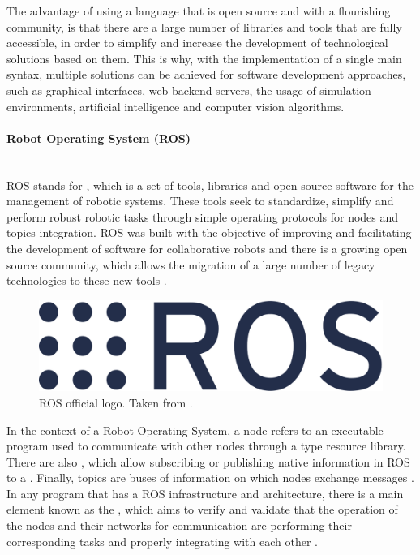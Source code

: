 \documentclass[11pt]{report} %
\newcommand{\subsubsubsection}[1]{\paragraph{#1}\mbox{}\\}
\begin{document}
The advantage of using a language that is open source and with a flourishing community, is that there are a large number of libraries and tools that are fully accessible, in order to simplify and increase the development of technological solutions based on them. This is why, with the implementation of a single main syntax, multiple solutions can be achieved for software development approaches, such as graphical interfaces, web backend servers, the usage of simulation environments, artificial intelligence and computer vision algorithms.\\

\subsubsubsection{Robot Operating System (ROS)}

ROS stands for , which is a set of tools, libraries and open source software for the management of robotic systems. These tools seek to standardize, simplify and perform robust robotic tasks through simple operating protocols for nodes and topics integration. ROS was built with the objective of improving and facilitating the development of software for collaborative robots and there is a growing open source community, which allows the migration of a large number of legacy technologies to these new tools \citep{cite_ROS_official_site}.\\

\begin{figure}[H]
    \centering
    \includegraphics[width=0.4\linewidth]{assets/imgs/reference_framework/ros_main_logo.png}
    \caption{ROS official logo. Taken from \citep{cite_ROS_official_site}.} 
    \label{fig_ros_main_logo}
\end{figure}

In the context of a Robot Operating System, a node refers to an executable program used to communicate with other nodes through a  type resource library. There are also , which allow subscribing or publishing native information in ROS to a . Finally, topics are buses of information on which nodes exchange messages \citep{cite_ROS_understanding_nodes}.\\

In any program that has a ROS infrastructure and architecture, there is a main element known as the , which aims to verify and validate that the operation of the nodes and their networks for communication are performing their corresponding tasks and properly integrating with each other \citep{cite_ROS_understanding_nodes}.\\
\end{document}
